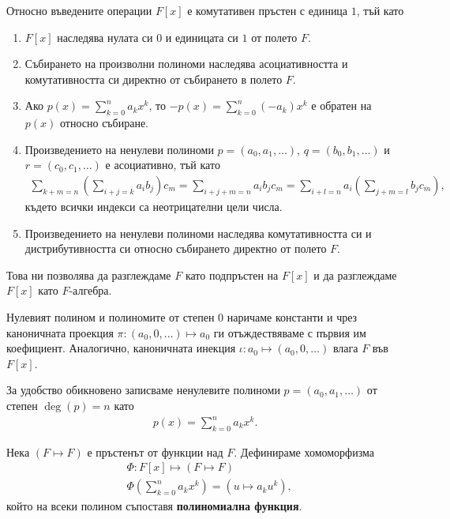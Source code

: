 \documentclass[numbers=endperiod, bibliography=totocnumbered]{scrartcl}
\begin{document}
Относно въведените операции \( F[x] \) е комутативен пръстен с единица \( 1 \), тъй като
\begin{enumerate}
  \item \( F[x] \) наследява нулата си \( 0 \) и единицата си \( 1 \) от полето \( F \).
  \item Събирането на произволни полиноми наследява асоциативността и комутативността си директно от събирането в полето \( F \).
  \item Ако \( p(x) = \sum_{k=0}^n a_k x^k \), то \( -p(x) = \sum_{k=0}^n (-a_k) x^k \) е обратен на \( p(x) \) относно събиране.
  \item Произведението на ненулеви полиноми \( p = (a_0, a_1, \ldots) \), \( q = (b_0, b_1, \ldots) \) и \( r = (c_0, c_1, \ldots) \) е асоциативно, тъй като
  \begin{align*}
    \sum_{k+m=n} \left(\sum_{i+j=k} a_i b_j \right) c_m
    =
    \sum_{i+j+m=n} a_i b_j c_m
    =
    \sum_{i+l=n} a_i \left( \sum_{j+m=l} b_j c_m \right),
  \end{align*}
  където всички индекси са неотрицателни цели числа.
  \item Произведението на ненулеви полиноми наследява комутативността си и дистрибутивността си относно събирането директно от полето \( F \).
\end{enumerate}

Това ни позволява да разглеждаме \( F \) като подпръстен на \( F[x] \) и да разглеждаме \( F[x] \) като \( F \)-алгебра.

Нулевият полином и полиномите от степен \( 0 \) наричаме константи и чрез каноничната проекция \( \pi: (a_0, 0, \ldots) \mapsto a_0 \) ги отъждествяваме с първия им коефициент. Аналогично, каноничната инекция \( \iota: a_0 \mapsto (a_0, 0, \ldots) \) влага \( F \) във \( F[x] \).

За удобство обикновено записваме ненулевите полиноми \( p = (a_0, a_1, \ldots) \) от степен \( \deg(p) = n \) като
\begin{align*}
  p(x) = \sum_{k=0}^n a_k x^k.
\end{align*}

Нека \( (F \mapsto F) \) е пръстенът от функции над \( F \). Дефинираме хомоморфизма
\begin{align*}
  &\Phi: F[x] \mapsto (F \mapsto F) \\
  &\Phi\left( \sum_{k=0}^n a_k x^k \right) = \left( u \mapsto a_k u^k \right),
\end{align*}
който на всеки полином съпоставя \textbf{полиномиална функция}.
\end{document}
